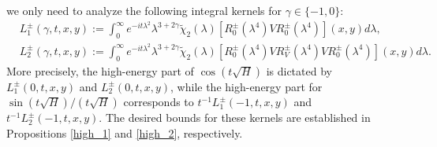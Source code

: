 \documentclass[reqno]{amsart}
\numberwithin{equation}{section}
\begin{document}
we only need to analyze the following integral kernels for $\gamma \in \{-1,0\}$:
$$
\begin{aligned}
\nonumber
& L_{1}^{\pm}(\gamma,t,x,y):=\int_0^{\infty} e^{-i t \lambda^2} \lambda^{3+2\gamma} \widetilde{\chi}_2(\lambda)[R_0^{ \pm}(\lambda^4)VR_0^{ \pm}(\lambda^4)](x, y) d\lambda, \\
&L_{2}^{\pm}(\gamma, t,x,y):=\int_0^{\infty} e^{-i t \lambda^2} \lambda^{3+2\gamma} \widetilde{\chi}_2(\lambda)[R_0^{\pm}(\lambda^4)VR_V^{\pm}(\lambda^4)VR_0^{\pm}(\lambda^4)](x, y) d\lambda.
\end{aligned}
$$
More precisely, the high-energy part of $\cos(t\sqrt{H})$ is dictated by $L_{1}^{\pm}(0,t,x,y)$ and $L_{2}^{\pm}(0,t,x,y)$, while the high-energy part for ${\sin(t\sqrt{H})}/({t\sqrt{H}})$ corresponds to $ t^{-1} L_{1}^{\pm}(-1,t,x,y)$ and $ t^{-1} L_{2}^{\pm}(-1,t,x,y)$. The desired bounds for these kernels are established in Propositions \ref{high_1} and \ref{high_2}, respectively.
\end{document}
